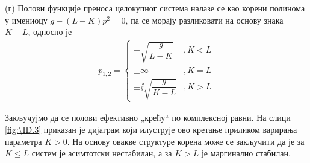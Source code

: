(г) Полови функције преноса целокупног система налазе се као корени полинома у имениоцу $g - (L-K)p^2 = 0$, па се морају разликовати на основу 
знака $K-L$, односно је 
\begin{eqnarray}
    p_{1,2} = \begin{cases}
        \pm\sqrt{ \dfrac{g}{L-K} } &, K < L \\
        \pm\infty &, K = L \\
        \pm\jj\sqrt{\dfrac{g}{K-L}} &, K > L
    \end{cases}
\end{eqnarray}

Закључујмо да се полови ефективно „крећу“ по комплексној равни. На слици \ref{fig:\ID.3} приказан је дијаграм који илуструје ово кретање приликом 
варирања параметра $K > 0$. На основу овакве структуре корена може се закључити да је за 
$K \leq L$ систем је асимтотски нестабилан, а за $K > L$ је маргинално стабилан. 